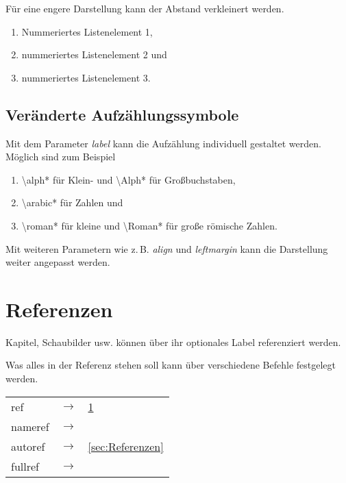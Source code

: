 Für eine engere Darstellung kann der Abstand verkleinert werden.

\begin{enumerate}
	\setlength\itemsep{0pt}
	\item Nummeriertes Listenelement 1,
	\item nummeriertes Listenelement 2 und
	\item nummeriertes Listenelement 3.
\end{enumerate}

\subsection{Veränderte Aufzählungssymbole}
\label{sub:Veraenderte_Aufzaehlungssymbole}

Mit dem Parameter \emph{label} kann die Aufzählung individuell gestaltet werden.
Möglich sind zum Beispiel

\begin{enumerate}[label=\Roman*.)]
	\setlength\itemsep{0pt}
	\item \textbackslash{}alph* für Klein- und \textbackslash{}Alph* für Großbuchstaben,
	\item \textbackslash{}arabic* für Zahlen und
	\item \textbackslash{}roman* für kleine und \textbackslash{}Roman* für große römische Zahlen.
\end{enumerate}

Mit weiteren Parametern wie z.\,B. \emph{align} und \emph{leftmargin} kann die Darstellung weiter angepasst werden.

\section{Referenzen}
\label{sec:Referenzen}

Kapitel, Schaubilder usw. können über ihr optionales Label referenziert werden.

Was alles in der Referenz stehen soll kann über verschiedene Befehle festgelegt werden.

{ %
	\def\arraystretch{1.2}
	\begin{tabular}{@{}lcl@{}} %
		\normalsize ref & $\rightarrow$ & \normalsize\ref{sec:Referenzen} \\
		\normalsize nameref & $\rightarrow$ & \normalsize\nameref{sec:Referenzen} \\
		\normalsize autoref & $\rightarrow$ & \normalsize\autoref{sec:Referenzen} \\
		\normalsize fullref & $\rightarrow$ & \normalsize\fullref{sec:Referenzen} \\
	\end{tabular}
}

